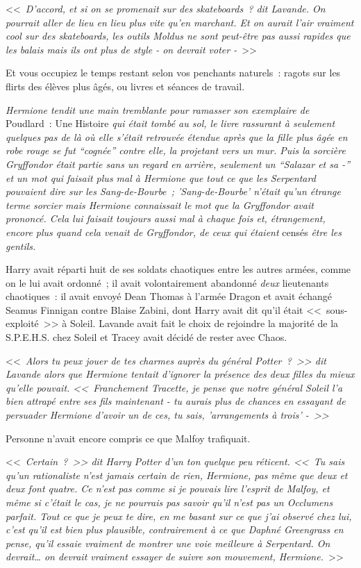 <<~\emph{D'accord, et si on se promenait sur des skateboards~? dit Lavande. On pourrait aller de lieu en lieu plus vite qu'en marchant. Et on aurait l'air vraiment cool sur des skateboards, les outils Moldus ne sont peut-être pas aussi rapides que les balais mais ils ont plus de style - on devrait voter -}~>>

Et vous occupiez le temps restant selon vos penchants naturels~: ragots sur les flirts des élèves plus âgés, ou livres et séances de travail.

\emph{Hermione tendit une main tremblante pour ramasser son exemplaire de} Poudlard~: Une Histoire \emph{qui était tombé au sol, le livre rassurant à seulement quelques pas de là où elle s'était retrouvée étendue après que la fille plus âgée en robe rouge se fut “cognée” contre elle, la projetant vers un mur. Puis la sorcière Gryffondor était partie sans un regard en arrière, seulement un “Salazar et sa -” et un mot qui faisait plus mal à Hermione que tout ce que les Serpentard pouvaient dire sur les Sang-de-Bourbe~; 'Sang-de-Bourbe' n'était qu'un étrange terme sorcier mais Hermione connaissait le mot que la Gryffondor avait prononcé. Cela lui faisait toujours aussi mal à chaque fois et, étrangement, encore plus quand cela venait de Gryffondor, de ceux qui étaient} censés \emph{être les gentils.}

Harry avait réparti huit de ses soldats chaotiques entre les autres armées, comme on le lui avait ordonné~; il avait volontairement abandonné \emph{deux} lieutenants chaotiques~: il avait envoyé Dean Thomas à l'armée Dragon et avait échangé Seamus Finnigan contre Blaise Zabini, dont Harry avait dit qu'il était <<~sous-exploité~>> à Soleil. Lavande avait fait le choix de rejoindre la majorité de la S.P.E.H.S. chez Soleil et Tracey avait décidé de rester avec Chaos.

<<~\emph{Alors tu peux jouer de tes charmes auprès du général Potter~?~>> dit Lavande alors que Hermione tentait d'ignorer la présence des deux filles du mieux qu'elle pouvait. <<~Franchement Tracette, je pense que notre général Soleil l'a bien attrapé entre ses fils maintenant - tu aurais plus de chances en essayant de persuader Hermione d'avoir un de ces, tu sais, 'arrangements à trois' -~>>}

Personne n'avait encore compris ce que Malfoy trafiquait.

<<~\emph{Certain~?~>> dit Harry Potter d'un ton quelque peu réticent. <<~Tu sais qu'un rationaliste n'est jamais certain de rien, Hermione, pas même que deux et deux font quatre. Ce n'est pas comme si je pouvais lire l'esprit de Malfoy, et même si c'était le cas, je ne pourrais pas savoir qu'il n'est pas un Occlumens parfait. Tout ce que je peux te dire, en me basant sur ce que j'ai observé chez lui, c'est qu'il est bien plus plausible, contrairement à ce que Daphné Greengrass en pense, qu'il essaie vraiment de montrer une voie meilleure à Serpentard. On devrait… on devrait vraiment essayer de suivre son mouvement, Hermione.}~>>

